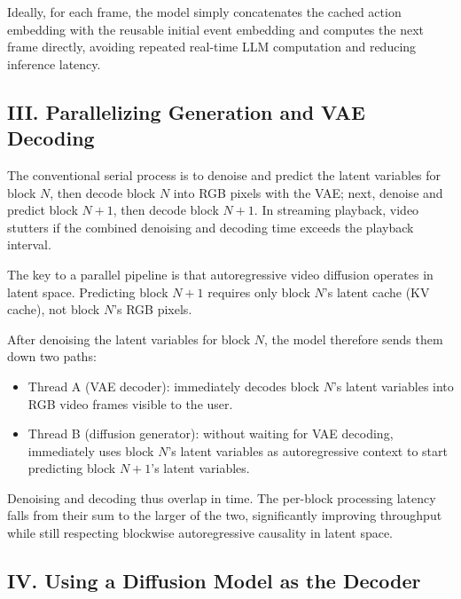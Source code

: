 Ideally, for each frame, the model simply concatenates the cached action embedding with the reusable initial event embedding and computes the next frame directly, avoiding repeated real-time LLM computation and reducing inference latency.

\hypertarget{iii.-parallelizing-generation-and-vae-decoding}{%
\subsection{III. Parallelizing Generation and VAE Decoding}\label{iii.-parallelizing-generation-and-vae-decoding}}

The conventional serial process is to denoise and predict the latent variables for block \(N\), then decode block \(N\) into RGB pixels with the VAE; next, denoise and predict block \(N+1\), then decode block \(N+1\). In streaming playback, video stutters if the combined denoising and decoding time exceeds the playback interval.

The key to a parallel pipeline is that autoregressive video diffusion operates in latent space. Predicting block \(N+1\) requires only block \(N\)'s latent cache (KV cache), not block \(N\)'s RGB pixels.

After denoising the latent variables for block \(N\), the model therefore sends them down two paths:

\begin{itemize}
\tightlist
\item
  Thread A (VAE decoder): immediately decodes block \(N\)'s latent variables into RGB video frames visible to the user.
\item
  Thread B (diffusion generator): without waiting for VAE decoding, immediately uses block \(N\)'s latent variables as autoregressive context to start predicting block \(N+1\)'s latent variables.
\end{itemize}

Denoising and decoding thus overlap in time. The per-block processing latency falls from their sum to the larger of the two, significantly improving throughput while still respecting blockwise autoregressive causality in latent space.

\hypertarget{iv.-using-a-diffusion-model-as-the-decoder}{%
\subsection{IV. Using a Diffusion Model as the Decoder}\label{iv.-using-a-diffusion-model-as-the-decoder}}

